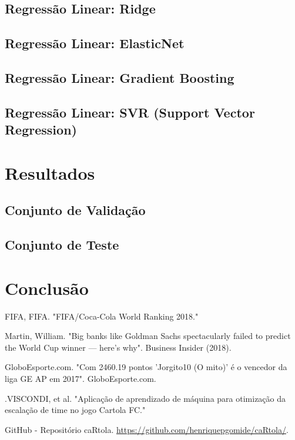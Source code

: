 \documentclass[conference]{IEEEtran}
\begin{document}
\subsection{Regressão Linear: Ridge}

\subsection{Regressão Linear: ElasticNet}

\subsection{Regressão Linear: Gradient Boosting}

\subsection{Regressão Linear: SVR (Support Vector Regression)}

\section{Resultados}

\subsection{Conjunto de Validação}

\subsection{Conjunto de Teste}

\section{Conclusão}

\begin{thebibliography}{00}

 FIFA, FIFA. "FIFA/Coca-Cola World Ranking 2018."

  Martin,   William.  "Big  banks  like   Goldman  Sachs
spectacularly failed to predict the  World Cup winner — here's why".
Business Insider (2018).

 GloboEsporte.com. "Com 2460.19 pontos 'Jorgito10
(O mito)' é o vencedor da liga GE AP em 2017". GloboEsporte.com.

   .VISCONDI,   et  al.   "Aplicação   de
aprendizado de  máquina para otimização  da escalação de  time no
jogo Cartola FC."

      GitHub     -      Repositório     caRtola.
\url{https://github.com/henriquepgomide/caRtola/}.

\end{thebibliography}
\end{document}
